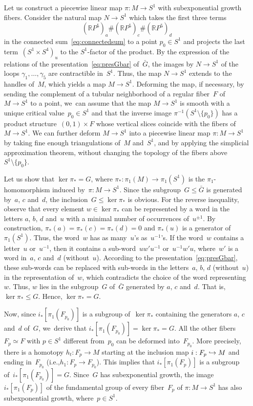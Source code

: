 \documentclass[11pt]{article}
\newcommand{\ie}{i.e.,\xspace}
\newcommand\hto{\mathrel{\lhook\joinrel\to}}
\theoremstyle{definition}
\newcommand\R{{\mathbb R}}
\numberwithin{equation}{section}
\begin{document}
Let us construct a piecewise linear map $\pi:M \to S^1$ with subexponential growth fibers.
Consider the natural map $N \to S^1$ which takes the first three terms
\[
(\R P^5)_a \# (\R P^5)_c \# (\R P^5)_d
\]
in the connected sum~\eqref{eq:connectedsum} to a point $p_0 \in S^1$ and projects the last term~$(S^1 \times S^4)_u$ to the $S^1$-factor of the product.
By the expression of the relations of the presentation~\eqref{eq:presGbar} of~$\bar{G}$, the images by $N \to S^1$ of the loops $\gamma_1,\dots,\gamma_5$ are contractible in~$S^1$.
Thus, the map $N \to S^1$ extends to the handles of~$M$, which yields a map $M \to S^1$.
Deforming the map, if necessary, by sending the complement of a tubular neighborhood of a regular fiber~$F$ of~$M \to S^1$ to a point, we~can assume that the map $M \to S^1$ is smooth with a unique critical value~$p_0 \in S^1$ and that the inverse image $\pi^{-1}(S^1 \setminus \{p_0\})$ has a product structure~$(0,1) \times F$ whose vertical slices coincide with the fibers of~$M \to S^1$.
We can further deform $M \to S^1$ into a piecewise linear map $\pi:M \to S^1$ by taking fine enough triangulations of~$M$ and~$S^1$, and by applying the simplicial approximation theorem, without changing the topology of the fibers above~$S^1 \setminus \{p_0\}$.

Let us show that $\ker \pi_* = G$, where $\pi_*:\pi_1(M) \to \pi_1(S^1)$ is the $\pi_1$-homomorphism induced by~$\pi:M \to S^1$.
Since the subgroup~$G \leqslant \bar{G}$ is generated by~$a$, $c$ and~$d$, the inclusion~$G \leqslant \ker \pi_*$ is obvious.
For the reverse inequality, observe that every element $w \in \ker \pi_*$ can be represented by a word in the letters $a$, $b$, $d$ and~$u$ with a minimal number of occurrences of~$u^{\pm 1}$.
By construction, $\pi_*(a) = \pi_*(c) = \pi_*(d) = 0$ and $\pi_*(u)$ is a generator of~$\pi_1(S^1)$.
Thus, the word~$w$ has as many~$u$'s as~$u^{-1}$'s.
If the word~$w$ contains a letter~$u$ or~$u^{-1}$, then it contains a sub-word~$uw'u^{-1}$ or~$u^{-1}w'u$, where~$w'$ is a word in~$a$, $c$ and~$d$ (without~$u$).
According to the presentation~\eqref{eq:presGbar}, these sub-words can be replaced with sub-words in the letters~$a$, $b$, $d$ (without~$u$) in the representation of~$w$, which contradicts the choice of the word representing~$w$.
Thus, $w$ lies in the subgroup~$G$ of~$\bar{G}$ generated by $a$, $c$ and~$d$.
That is, $\ker \pi_* \leqslant G$.
Hence, $\ker \pi_* =G$.

Now, since $i_*[\pi_1(F_{p_0})]$ is a subgroup of~$\ker \pi_*$ containing the generators $a$, $c$ and~$d$ of~$G$, we~derive that $i_*[\pi_1(F_{p_0})] = \ker \pi_* = G$.
All the other fibers~$F_p \simeq F$ with $p \in S^1$ different from~$p_0$ can be deformed into~$F_{p_0}$.
More precisely, there is a homotopy $h_t:F_p \to M$ starting at the inclusion map $i:F_p \hto M$ and ending in~$F_{p_0}$ \hbox{(\ie $h_1:F_p \to F_{p_0}$)}.
This implies that $i_*[\pi_1(F_p)]$ is a subgroup of~$i_*[\pi_1(F_{p_0})] = G$.
Since~$G$ has subexponential growth, the image~$i_*[\pi_1(F_p)]$ of the fundamental group of every fiber~$F_p$ of $\pi:M \to S^1$ has also subexponential growth, where~$p \in S^1$.
\end{document}
